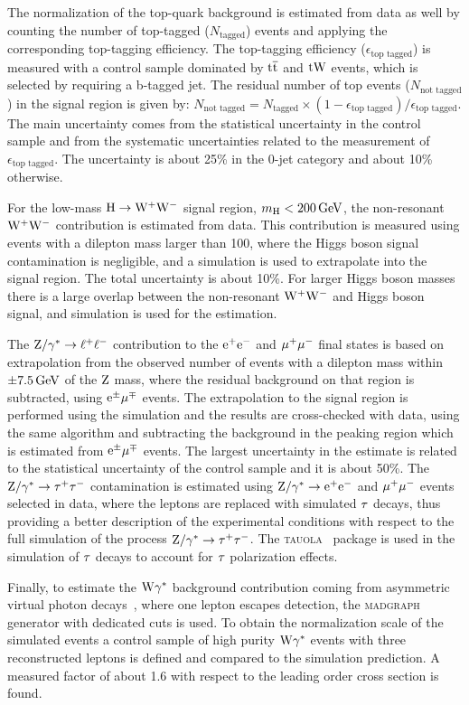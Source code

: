 \documentclass[11pt,twoside,a4paper,cmspaper,final,collab]{cms-tdr}
\begin{document}
The normalization of the top-quark background is estimated from data as well
by counting the number of top-tagged ($N_\text{tagged}$) events and applying the
corresponding top-tagging efficiency. The top-tagging efficiency
($\epsilon_\text{top tagged}$) is measured with a control sample dominated by
$\mathrm{t}\overline{\mathrm{t}}$ and $\mathrm{t}\mathrm{W}$ events, which is selected by requiring a b-tagged jet.
The residual number of top events ($N_\text{not tagged}$) in the signal region is given
by: $N_\text{not tagged} = N_\text{tagged} \times
 (1-\epsilon_\text{top tagged})/\epsilon_\text{top~tagged}$.
The main uncertainty comes from the statistical
uncertainty in the control sample and from the systematic uncertainties related to
the measurement of $\epsilon_\text{top tagged}$. The uncertainty is about
25\% in the 0-jet category and about 10\% otherwise.

For the low-mass $\mathrm{H}\to\mathrm{W^+}{}\mathrm{W^-}$ signal region, $m_{\mathrm{H}} <200\,\text{Ge\hspace{-.08em}V}$,
the non-resonant $\mathrm{W^+}{}\mathrm{W^-}$ contribution is estimated from data. This contribution
is measured using events with a dilepton mass larger than 100\GeV,
where the Higgs boson signal contamination is negligible, and a simulation
is used to extrapolate into the signal region. The total uncertainty is about 10\%.
For larger Higgs boson masses there is a large overlap between the
non-resonant $\mathrm{W^+}{}\mathrm{W^-}$ and Higgs boson signal, and simulation is
used for the estimation.

The $\mathrm{Z}/\gamma^*\to \ell^+\ell^-$ contribution to the $\mathrm{e}^+\mathrm{e}^-$
and ${\mu^+}{\mu^-}$ final states is based on extrapolation from
the observed number of events with a dilepton mass
within $\pm7.5\,\text{Ge\hspace{-.08em}V}$ of the $\mathrm{Z}$ mass, where the residual
background on that region is subtracted, using $\mathrm{e}^{\pm}{\mu}^{\mp}$ events.
The extrapolation to the signal region is performed using the simulation
and the results are cross-checked with data, using the same algorithm and
subtracting the background in the peaking region which is estimated from $\mathrm{e}^{\pm}{\mu}^{\mp}$ events.
The largest uncertainty in the estimate is related to the statistical
uncertainty of the control sample and it is about 50\%.
The $\mathrm{Z}/\gamma^* \to\tau^+\tau^-$ contamination is estimated using $\mathrm{Z}/\gamma^*\to \mathrm{e}^+\mathrm{e}^-$ and ${\mu^+}{\mu^-}$
events selected in data, where the leptons are replaced with simulated
$\tau$ decays, thus providing a better description of the experimental conditions
with respect to the full simulation of the process $\mathrm{Z}/\gamma^* \to\tau^+\tau^-$. The \textsc{tauola}~\cite{tauola} package is used in the
simulation of $\tau$ decays to account for $\tau$ polarization effects.

Finally, to estimate the $\mathrm{W}\gamma^{*}$ background contribution coming
from asymmetric virtual photon decays~\cite{wgammastart}, where one lepton escapes
detection, the \textsc{madgraph} generator with dedicated cuts is
used. To obtain the normalization scale of the
simulated events a control sample of high purity $\mathrm{W}\gamma^{*}$ events with three
reconstructed leptons is defined and compared to the simulation prediction. A
measured factor of about 1.6 with respect to the leading order
cross section is found.
\end{document}
